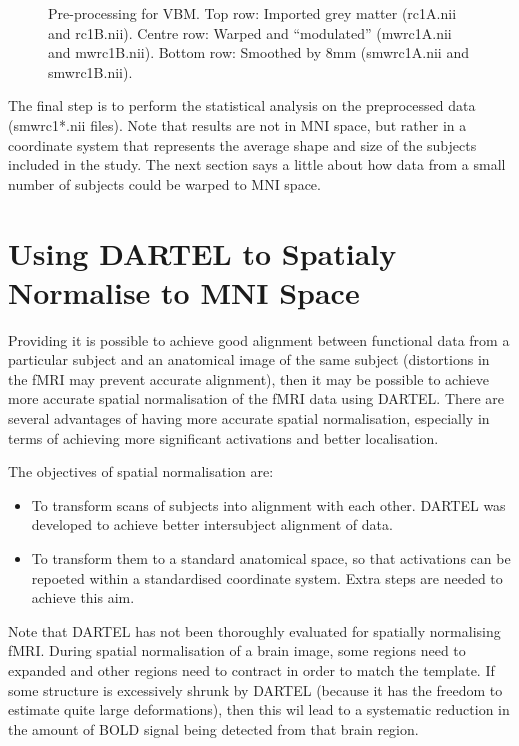 \begin{figure}
\begin{center}
\end{center}
\caption{
Pre-processing for VBM.
Top row: Imported grey matter (rc1A.nii and rc1B.nii).
Centre row: Warped and ``modulated'' (mwrc1A.nii and mwrc1B.nii).
Bottom row: Smoothed by 8mm (smwrc1A.nii and smwrc1B.nii).
\label{Fig:VBM}}
\end{figure}

The final step is to perform the statistical analysis on the preprocessed data (smwrc1*.nii files).
Note that results are not in MNI space, but rather in a coordinate system that represents the average shape and size of the subjects included in the study.
The next section says a little about how data from a small number of subjects could be warped to MNI space.



\section{Using DARTEL to Spatialy Normalise to MNI Space}
Providing it is possible to achieve good alignment between functional data from a particular subject and an anatomical image of the same subject (distortions in the fMRI may prevent accurate alignment), then it may be possible to achieve more accurate spatial normalisation of the fMRI data using DARTEL.
There are several advantages of having more accurate spatial normalisation, especially in terms of achieving more significant activations and better localisation.

The objectives of spatial normalisation are:
\begin{itemize}
\item{To transform scans of subjects into alignment with each other.
DARTEL was developed to achieve better intersubject alignment of data.
}
\item{To transform them to a standard anatomical space, so that activations can be repoeted within a standardised coordinate system.
Extra steps are needed to achieve this aim.
}
\end{itemize}

Note that DARTEL has not been thoroughly evaluated for spatially normalising fMRI.
During spatial normalisation of a brain image, some regions need to expanded and other regions need to contract in order to match the template.
If some structure is excessively shrunk by DARTEL (because it has the freedom to estimate quite large deformations), then this wil lead to a systematic reduction in the amount of BOLD signal being detected from that brain region.


